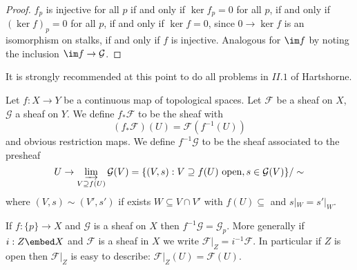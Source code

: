 \documentclass[a4paper]{article}
\newcommand{\sh}[1]{\mathcal{#1}} %
\begin{document}
\begin{proof}
  \(f_p\) is injective for all \(p\) if and only if \(\ker f_p = 0\) for all \(p\), if and only if \((\ker f)_p = 0\) for all \(p\), if and only if \(\ker f = 0\), since \(0 \to \ker f\) is an isomorphism on stalks, if and only if \(f\) is injective. Analogous for \(\im f\) by noting the inclusion \(\im f \to \sh G\).
\end{proof}

It is strongly recommended at this point to do all problems in \(II.1\) of Hartshorne.

\begin{definition}
  Let \(f: X \to Y\) be a continuous map of topological spaces. Let \(\sh F\) be a sheaf on \(X\), \(\sh G\) a sheaf on \(Y\). We define \(f_* \sh F\) to be the sheaf with
  \[
    (f_* \sh F)(U) = \sh F (f^{-1}(U))
  \]
  and obvious restriction maps. We define \(f^{-1} \sh G\) to be the sheaf associated to the presheaf
  \[
    U \to \varinjlim_{V \supseteq f(U)} \sh G(V) = \{(V, s): V \supseteq f(U) \text{ open}, s \in \sh G(V)\}/ \sim
  \]
  where \((V, s) \sim (V', s')\) if exists \(W \subseteq V \cap V'\) with \(f(U) \subseteq \) and \(s|_W = s'|_W\).
\end{definition}

\begin{eg}
  If \(f: \{p\} \to X\) and \(\sh G\) is a sheaf on \(X\) then \(f^{-1} \sh G = \sh G_p\). More generally if \(i: Z \embed X\) and \(\sh F\) is a sheaf in \(X\) we write \(\sh F|_Z = i^{-1} \sh F\). In particular if \(Z\) is open then \(\sh F|_Z\) is easy to describe: \(\sh F|_Z(U) = \sh F(U)\).
\end{eg}




\printindex
\end{document}
